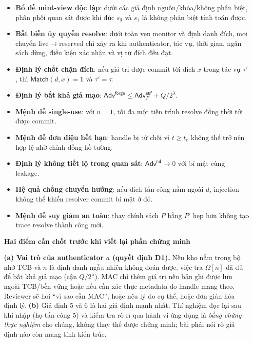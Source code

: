 \documentclass[11pt,a4paper]{article}
\newcommand{\term}[1]{\textbf{#1}}
\newenvironment{callout}[1]
  {\par\vspace{0.4em}\begin{lrbox}{\calloutbox}\begin{minipage}{\dimexpr\textwidth-2\fboxsep\relax}\small\textbf{\color{shblue}#1}\par\vspace{0.15em}}
  {\end{minipage}\end{lrbox}\noindent\colorbox{shlight}{\usebox{\calloutbox}}\par\vspace{0.4em}}
\begin{document}
\begin{itemize}
  \item \term{Bổ đề mint-view độc lập}: dưới các giả định nguồn/khóa/không phân biệt, phân phối quan sát được
        khi đúc $s_0$ và $s_1$ là không phân biệt tính toán được.
  \item \term{Bất biến ủy quyền resolve}: dưới toàn vẹn monitor và định danh đích, mọi chuyển live$\to$reserved
        chỉ xảy ra khi authenticator, tác vụ, thời gian, ngân sách dùng, điều kiện xác nhận và vị từ đích đều đạt.
  \item \term{Định lý chốt chặn đích}: nếu giá trị được commit tới đích $x$ trong tác vụ $\tau'$, thì
        $\mathsf{Match}(d, x) = 1$ và $\tau' = \tau$.
  \item \term{Định lý bất khả giả mạo}:
        $\mathsf{Adv}^{\mathsf{forge}} \le \mathsf{Adv}^{\mathsf{euf}}_{F} + Q/2^\lambda$.
  \item \term{Mệnh đề single-use}: với $u = 1$, tối đa một tiến trình resolve đồng thời tới được commit.
  \item \term{Mệnh đề đơn điệu hết hạn}: handle bị từ chối vì $t \ge t_e$ không thể trở nên hợp lệ nhờ chỉnh
        đồng hồ tường.
  \item \term{Định lý không tiết lộ trong quan sát}: $\mathsf{Adv}^{\mathsf{nd}} \to 0$ với bí mật cùng leakage.
  \item \term{Hệ quả chống chuyển hướng}: nếu đích tấn công nằm ngoài $d$, injection không thể khiến resolver
        commit bí mật ở đó.
  \item \term{Mệnh đề suy giảm an toàn}: thay chính sách $P$ bằng $P'$ hẹp hơn không tạo trace resolve thành
        công mới.
\end{itemize}

\begin{callout}{Hai điểm cần chốt trước khi viết lại phần chứng minh}
\textbf{(a) Vai trò của authenticator $a$ (quyết định D1).} Nếu kho nằm trong bộ nhớ TCB và $n$ là định danh ngẫu nhiên không đoán được,
việc tra $\Omega[n]$ đã đủ để bất khả giả mạo (cận $Q/2^\lambda$). MAC chỉ thêm giá trị nếu bản ghi được lưu ngoài TCB/bền vững hoặc nếu
cần xác thực metadata do handle mang theo. Reviewer sẽ hỏi ``vì sao cần MAC''; hoặc nêu lý do cụ thể, hoặc đơn giản hóa định lý.
\textbf{(b)} Giả định 5 và 6 là hai giả định mạnh nhất. Thí nghiệm đọc lại sau khi nhập (họ tấn công 5) và kiểm tra rò rỉ qua hành vi
ứng dụng là \emph{bằng chứng thực nghiệm} cho chúng, không thay thế được chứng minh; bài phải nói rõ giả định nào còn mang tính kiến trúc.
\end{callout}
\end{document}
